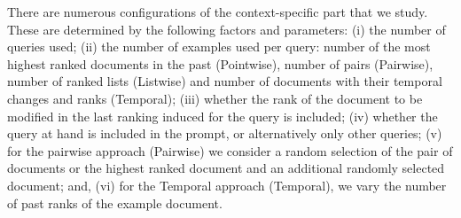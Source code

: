 There are numerous configurations
of the context-specific part that we
study. These are determined by the following factors and parameters:
(i) the number of queries used; (ii) the number of examples used per
query: number of the most highest ranked documents in the past (Pointwise),
number of pairs (Pairwise), number of ranked lists (Listwise) and number of
documents with their temporal changes and ranks (Temporal); (iii) whether
the rank of the document to be modified in the last ranking induced
for the query is included; (iv) whether the query at hand is included
in the prompt, or alternatively only other queries; (v) for the
pairwise approach (Pairwise) we consider a random selection of the pair of
documents or the highest ranked document and an additional randomly
selected document; and, (vi) for the Temporal approach (Temporal), we vary the number of past ranks of the example document.  
%

